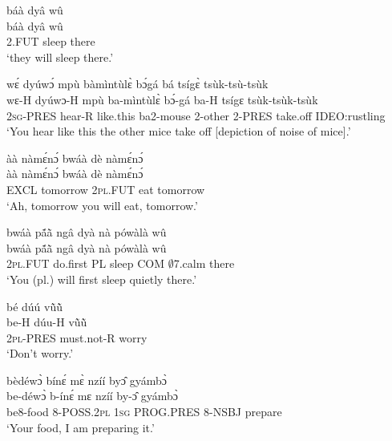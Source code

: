 \begin{exe} 
\exN\label{187}
  \glll báà dyâ wû \\
       báà dyâ wû \\
       2.FUT sleep there  \\
    \trans `they will sleep there.'
\end{exe}

\begin{exe} 
\exN\label{188}
  \glll wɛ́ dyúwɔ́ mpù bàmìntùlɛ̀ bɔ́gá bá tsígɛ̀ tsùk-tsù-tsùk\\
         wɛ-H dyúwɔ-H mpù ba-mìntùlɛ̀ bɔ́-gá ba-H tsígɛ tsùk-tsùk-tsùk\\
        2\textsc{sg}-PRES hear-R like.this ba2-mouse 2-other 2-PRES take.off IDEO:rustling\\
    \trans `You hear like this the other mice take off [depiction of noise of mice].'
\end{exe}

\begin{exe} 
\exN\label{189}
  \glll àà nàmɛ́nɔ́ bwáà dè nàmɛ́nɔ́ \\
        àà nàmɛ́nɔ́ bwáà dè nàmɛ́nɔ́ \\
       EXCL tomorrow 2\textsc{pl}.FUT eat tomorrow  \\
    \trans `Ah, tomorrow you will eat, tomorrow.'
\end{exe}

\begin{exe} 
\exN\label{190}
  \glll bwáà pã́ã̀ ngâ dyà nà pówàlà wû \\
        bwáà pã́ã̀ ngâ dyà nà pówàlà wû \\
        2\textsc{pl}.FUT do.first PL sleep COM $\emptyset$7.calm there \\
    \trans `You (pl.) will first sleep quietly there.'
\end{exe}

\begin{exe} 
\exN\label{191}
  \glll bé dúú vũ̀ũ̀ \\
      be-H dúu-H vũ̀ũ̀ \\
        2\textsc{pl}-PRES must.not-R worry \\
    \trans `Don't worry.'
\end{exe}

\begin{exe} 
\exN\label{192} 
  \glll bèdéwɔ̀ bínɛ́ mɛ̀ nzíí byɔ̂ gyámbɔ̀ \\
      be-déwɔ̀ b-ínɛ́ mɛ nzíí by-ɔ̂ gyámbɔ̀ \\
       be8-food 8-POSS.2\textsc{pl} 1\textsc{sg} PROG.PRES 8-NSBJ prepare  \\
    \trans `Your food, I am preparing it.'
\end{exe}

